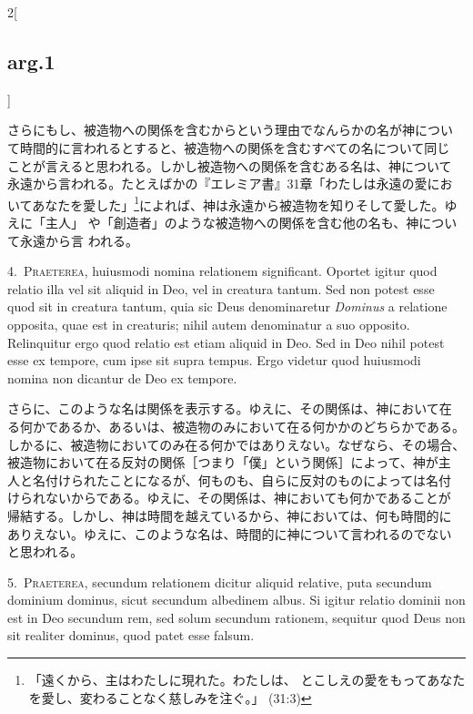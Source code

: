 \documentclass[paper=a4paper,fontsize=10pt,jafontsize=9pt,titlepage]{jlreq}
\begin{document}
\begin{paracol}{2}[\subsection{arg.1}]
\switchcolumn

さらにもし、被造物への関係を含むからという理由でなんらかの名が神につい
て時間的に言われるとすると、被造物への関係を含むすべての名について同じ
ことが言えると思われる。しかし被造物への関係を含むある名は、神について
永遠から言われる。たとえばかの『エレミア書』31章「わたしは永遠の愛にお
いてあなたを愛した」\footnote{「遠くから、主はわたしに現れた。わたしは、
とこしえの愛をもってあなたを愛し、変わることなく慈しみを注ぐ。」
(31:3)}によれば、神は永遠から被造物を知りそして愛した。ゆえに「主人」
や「創造者」のような被造物への関係を含む他の名も、神について永遠から言
われる。


4.~{\scshape Praeterea}, huiusmodi nomina relationem
significant. Oportet igitur quod relatio illa vel sit aliquid in Deo,
vel in creatura tantum. Sed non potest esse quod sit in creatura
tantum, quia sic Deus denominaretur {\itshape Dominus} a relatione
opposita, quae est in creaturis; nihil autem denominatur a suo
opposito. Relinquitur ergo quod relatio est etiam aliquid in Deo. Sed
in Deo nihil potest esse ex tempore, cum ipse sit supra tempus. Ergo
videtur quod huiusmodi nomina non dicantur de Deo ex tempore.

\switchcolumn

さらに、このような名は関係を表示する。ゆえに、その関係は、神において在
る何かであるか、あるいは、被造物のみにおいて在る何かかのどちらかである。
しかるに、被造物においてのみ在る何かではありえない。なぜなら、その場合、
被造物において在る反対の関係［つまり「僕」という関係］によって、神が主
人と名付けられたことになるが、何ものも、自らに反対のものによっては名付
けられないからである。ゆえに、その関係は、神においても何かであることが
帰結する。しかし、神は時間を越えているから、神においては、何も時間的に
ありえない。ゆえに、このような名は、時間的に神について言われるのでない
と思われる。


5.~{\scshape Praeterea}, secundum relationem dicitur aliquid relative,
puta secundum dominium dominus, sicut secundum albedinem albus. Si
igitur relatio dominii non est in Deo secundum rem, sed solum secundum
rationem, sequitur quod Deus non sit realiter dominus, quod patet esse
falsum.


\end{paracol}
\end{document}
